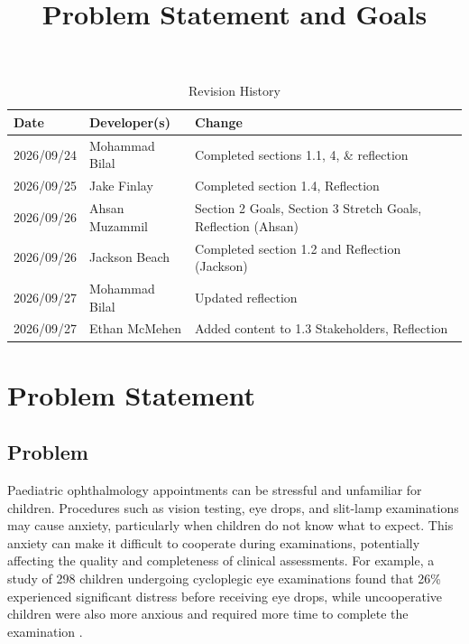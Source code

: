 \documentclass{article}
\title{Problem Statement and Goals\\\progname}
\author{\authname}
\date{}
\begin{document}
\maketitle

\newpage{}

\begin{table}[hp]
\caption{Revision History} \label{TblRevisionHistory}
\begin{tabularx}{\textwidth}{llX}
\toprule
\textbf{Date} & \textbf{Developer(s)} & \textbf{Change}\\
\midrule
2026/09/24 & Mohammad Bilal & Completed sections 1.1, 4, \& reflection \\
2026/09/25 & Jake Finlay & Completed section 1.4, Reflection \\
2026/09/26 & Ahsan Muzammil & Section 2 Goals, Section 3 Stretch Goals, Reflection (Ahsan) \\
2026/09/26 & Jackson Beach & Completed section 1.2 and Reflection (Jackson) \\
2026/09/27 & Mohammad Bilal & Updated reflection \\
2026/09/27 & Ethan McMehen & Added content to 1.3 Stakeholders, Reflection \\
\bottomrule
\end{tabularx}
\end{table}

\newpage{}

\section{Problem Statement}

\subsection{Problem}

Paediatric ophthalmology appointments can be stressful and unfamiliar for children.
Procedures such as vision testing, eye drops, and slit-lamp examinations may cause anxiety, particularly when children do not know what to expect.
This anxiety can make it difficult to cooperate during examinations, potentially affecting the quality and completeness of clinical assessments.
For example, a study of 298 children undergoing cycloplegic eye examinations found that 26\% experienced significant distress before receiving eye drops,
while uncooperative children were also more anxious and required more time to complete the examination \cite{ChiaEtAl2015}.
\end{document}
